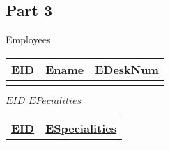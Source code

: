 \documentclass[a4paper,11pt,x11names]{article}
\begin{document}
\subsection{Part 3}
    Employees
	\begin{tabular}{|c|c|c|}
	\hline \underline{EID} & \underline{Ename}  & EDeskNum  \\ 
	\hline  &  &    \\ 
	\hline 
	\end{tabular} 
	\newline
	$EID\_EPecialities$
	\begin{tabular}{|c|c|}
		\hline \underline{EID}  & \underline{ESpecialities}   \\ 
		\hline  &    \\ 
		\hline 
	\end{tabular} 
	\newline	
	
\end{document}

